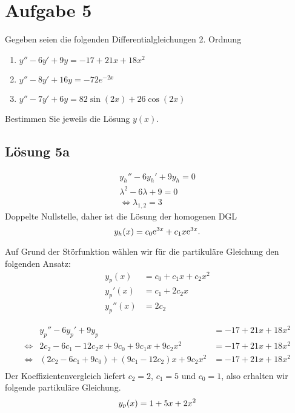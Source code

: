 \documentclass[main.tex]{subfiles}
\begin{document}
\section{Aufgabe 5}
Gegeben seien die folgenden Differentialgleichungen 2. Ordnung
\begin{enumerate}
    \item $y'' - 6y' + 9y = -17 + 21x + 18x^2$
    \item $y'' - 8y' + 16y = -72e^{-2x}$
    \item $y'' - 7y' + 6y = 82\sin(2x) + 26\cos(2x)$
\end{enumerate}
Bestimmen Sie jeweils die Lösung $y(x)$.

\subsection{Lösung 5a}
\begin{align*}
    y_h'' - 6y_h' + 9y_h = 0 \\[5mm]
    \lambda^2 -6 \lambda + 9 = 0 \\
    \Leftrightarrow \lambda_{1,2} = 3
\end{align*}
Doppelte Nullstelle, daher ist die Lösung der homogenen DGL
$$
    y_h(x) = c_0 \mathrm{e}^{3x} + c_1 x \mathrm{e}^{3x}. \\
$$

Auf Grund der Störfunktion wählen wir für die partikuläre Gleichung den folgenden Ansatz:
\begin{align*}
    y_p(x)   &= c_0 + c_1 x + c_2 x^2\\
    y_p'(x)  &= c_1 + 2 c_2 x\\
    y_p''(x) &= 2 c_2
\end{align*}

\begin{equation*}
\begin{array}{rll}
                & y_p'' - 6y_p' + 9y_p &= -17 + 21x + 18x^2 \\
\Leftrightarrow & 2 c_2 - 6c_1 - 12 c_2 x + 9c_0 + 9c_1 x + 9c_2 x^2 &= -17 + 21x + 18x^2\\
\Leftrightarrow & \left(2 c_2 - 6c_1 + 9c_0\right)
    + \left(9c_1 - 12 c_2\right) x 
    + 9c_2 x^2 &= -17 + 21x + 18x^2\\
\end{array}
\end{equation*}
Der Koeffizientenvergleich liefert $c_2 =2$, $c_1 = 5$ und 
$c_0 = 1$, also erhalten wir folgende partikuläre Gleichung.
$$
    y_p(x) = 1 + 5x + 2x^2\\
$$
\end{document}
